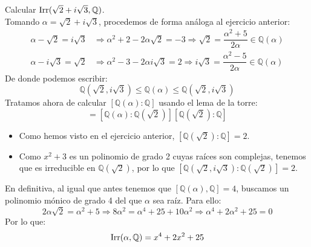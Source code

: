 \begin{ejercicio}
    Calcular $\operatorname{Irr}(\sqrt{2}+i\sqrt{3},\mathbb{Q})$.\\

    \noindent
    Tomando $\alpha = \sqrt{2}+i\sqrt{3}$, procedemos de forma análoga al ejercicio anterior:
    \begin{align*}
        \alpha-\sqrt{2} = i\sqrt{3} &\Longrightarrow \alpha^2 + 2 - 2\alpha\sqrt{2} = -3 \Longrightarrow \sqrt{2} = \dfrac{\alpha^2+5}{2\alpha} \in \mathbb{Q}(\alpha)\\
        \alpha-i\sqrt{3} = \sqrt{2} &\Longrightarrow \alpha^2 -3 -2\alpha i \sqrt{3} = 2 \Longrightarrow i\sqrt{3} = \dfrac{\alpha^2-5}{2\alpha} \in \mathbb{Q}(\alpha)
    \end{align*}
    De donde podemos escribir:
    \begin{equation*}
        \mathbb{Q}(\sqrt{2},i\sqrt{3}) \leq \mathbb{Q}(\alpha) \leq \mathbb{Q}(\sqrt{2},i\sqrt{3})
    \end{equation*}
    Tratamos ahora de calcular $[\mathbb{Q}(\alpha):\mathbb{Q}]$ usando el lema de la torre:
    \begin{equation*}
        [\mathbb{Q}(\alpha):\mathbb{Q}] = [\mathbb{Q}(\alpha):\mathbb{Q}(\sqrt{2})][\mathbb{Q}(\sqrt{2}):\mathbb{Q}]
    \end{equation*}
    \begin{itemize}
        \item Como hemos visto en el ejercicio anterior, $[\mathbb{Q}(\sqrt{2}):\mathbb{Q}]=2$.
        \item Como $x^2+3$ es un polinomio de grado 2 cuyas raíces son complejas, tenemos que es irreducible en $\mathbb{Q}(\sqrt{2})$, por lo que $[\mathbb{Q}(\sqrt{2},i\sqrt{3}):\mathbb{Q}(\sqrt{2})] = 2$.
    \end{itemize}
    En definitiva, al igual que antes tenemos que $[\mathbb{Q}(\alpha),\mathbb{Q}] = 4$, buscamos un polinomio mónico de grado 4 del que $\alpha$ sea raíz. Para ello:
    \begin{equation*}
        2\alpha\sqrt{2} = \alpha^2 + 5 \Longrightarrow 8\alpha^2 = \alpha^4 + 25 + 10\alpha^2 \Longrightarrow \alpha^4 + 2\alpha^2 + 25 = 0
    \end{equation*}
    Por lo que:
    \begin{equation*}
        \operatorname{Irr}(\alpha,\mathbb{Q}) = x^4+2x^2+25
    \end{equation*}
\end{ejercicio}

